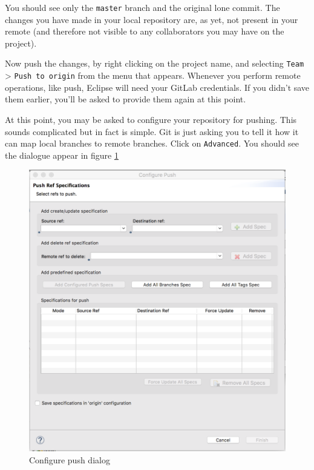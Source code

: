 \documentclass[
]{book}
\begin{document}
You should see only the \texttt{master} branch and the original lone commit. The changes you have made in your local repository are, as yet, not present in your remote (and therefore not visible to any collaborators you may have on the project).

Now push the changes, by right clicking on the project name, and selecting \texttt{Team} \textgreater{} \texttt{Push\ to\ origin} from the menu that appears. Whenever you perform remote operations, like push, Eclipse will need your GitLab credentials. If you didn't save them earlier, you'll be asked to provide them again at this point.

At this point, you may be asked to configure your repository for pushing. This sounds complicated but in fact is simple. Git is just asking you to tell it how it can map local branches to remote branches. Click on \texttt{Advanced}. You should see the dialogue appear in figure \ref{fig:configurePushRefSpecs-fig}

\begin{figure}

{\centering \includegraphics[width=1\linewidth]{images/configurePushRefSpecs} 

}

\caption{Configure push dialog}\label{fig:configurePushRefSpecs-fig}
\end{figure}
\end{document}
